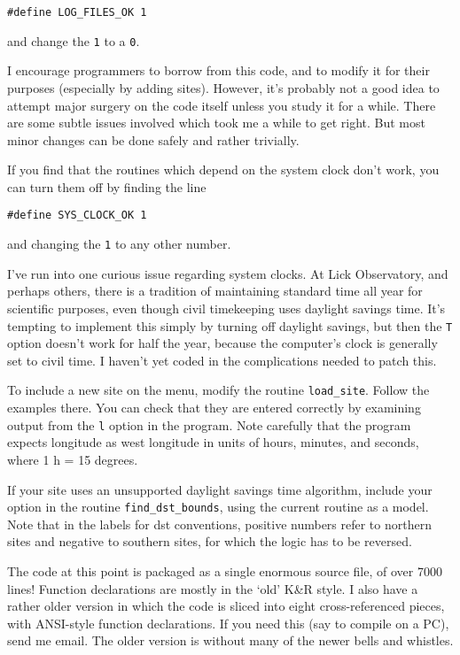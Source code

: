 {\tt \#define LOG\_FILES\_OK 1} 

and change the {\tt 1} to a {\tt 0}.

I encourage programmers to borrow from this code, and to modify it
for their purposes (especially by adding sites).  However, it's
probably not a good idea to attempt major surgery on the code itself unless
you study it for a while.   There are some subtle issues involved
which took me a while to get right.  But most minor
changes can be done safely and rather trivially.

If you find that the routines which depend on the system clock
don't work, you can turn them off by finding the line

{\tt \#define SYS\_CLOCK\_OK 1}

and changing the {\tt 1} to any other number.

I've run into one curious issue regarding system clocks.  At Lick
Observatory, and perhaps others, there is a tradition of maintaining 
standard time all year for scientific purposes, even though civil
timekeeping uses daylight savings time.  It's tempting to implement 
this simply by turning off daylight savings, but then the {\tt T}
option doesn't work for half the year, because the computer's clock
is generally set to civil time.  I haven't yet coded in the 
complications needed to patch this.

To include a new site on the menu, modify the routine
{\tt load\_site}.  Follow the examples there.  You can check
that they are entered correctly by examining output from 
the {\tt l} option in the program.  Note carefully that the 
program expects longitude as west longitude in units of hours, 
minutes, and seconds, where 1 h = 15 degrees.

If your site uses an unsupported daylight savings time algorithm,
include your option in the routine {\tt find\_dst\_bounds}, using
the current routine as a model.  Note that in the labels for
dst conventions, positive numbers refer to northern sites and
negative to southern sites, for which the logic has to be reversed.

The code at this point is packaged as a single enormous source
file, of over 7000 lines!  Function declarations are mostly in the
`old' K\&R style.  I also have a rather older version in which the
code is sliced into eight cross-referenced pieces, with 
ANSI-style function declarations.  If you need this (say to
compile on a PC), send me email.  The older version is without 
many of the newer bells and whistles.

